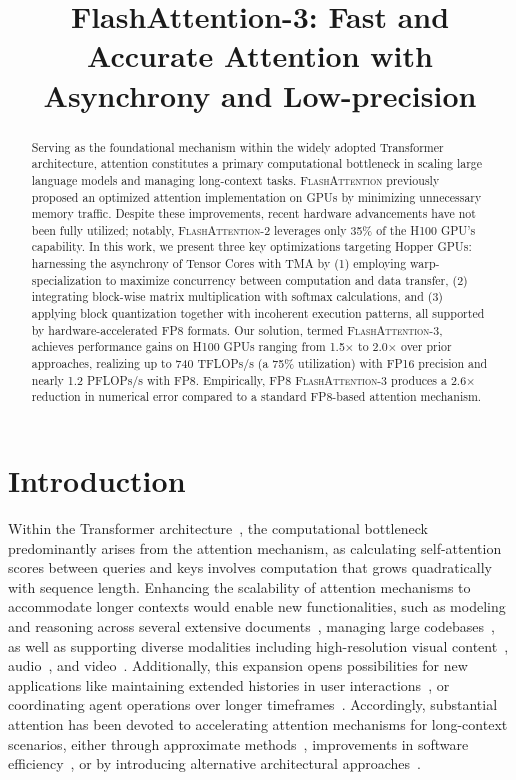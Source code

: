 \title{FlashAttention-3: Fast and Accurate Attention with Asynchrony and Low-precision}

\begin{abstract}
Serving as the foundational mechanism within the widely adopted Transformer architecture, attention constitutes a primary computational bottleneck in scaling large language models and managing long-context tasks. \textsc{FlashAttention} previously proposed an optimized attention implementation on GPUs by minimizing unnecessary memory traffic. Despite these improvements, recent hardware advancements have not been fully utilized; notably, \textsc{FlashAttention-2} leverages only 35\% of the H100 GPU’s capability. In this work, we present three key optimizations targeting Hopper GPUs: harnessing the asynchrony of Tensor Cores with TMA by (1) employing warp-specialization to maximize concurrency between computation and data transfer, (2) integrating block-wise matrix multiplication with softmax calculations, and (3) applying block quantization together with incoherent execution patterns, all supported by hardware-accelerated FP8 formats. Our solution, termed \textsc{FlashAttention-3}, achieves performance gains on H100 GPUs ranging from 1.5$\times$ to 2.0$\times$ over prior approaches, realizing up to 740 TFLOPs/s (a 75\% utilization) with FP16 precision and nearly 1.2 PFLOPs/s with FP8. Empirically, FP8 \textsc{FlashAttention-3} produces a 2.6$\times$ reduction in numerical error compared to a standard FP8-based attention mechanism.
\end{abstract}

\section{Introduction}
\label{sec:intro}

Within the Transformer architecture~\citep{vaswani2017attention}, the computational bottleneck predominantly arises from the attention mechanism, as calculating self-attention scores between queries and keys involves computation that grows quadratically with sequence length. Enhancing the scalability of attention mechanisms to accommodate longer contexts would enable new functionalities, such as modeling and reasoning across several extensive documents~\citep{guo2021longt5,shaham2022scrolls,peng2023yarn}, managing large codebases~\citep{roziere2023code, li2023starcoder}, as well as supporting diverse modalities including high-resolution visual content~\citep{chen2022scaling}, audio~\citep{gulati2020conformer}, and video~\citep{ho2022video}. Additionally, this expansion opens possibilities for new applications like maintaining extended histories in user interactions~\citep{sun2019bert4rec}, or coordinating agent operations over longer timeframes~\citep{yao2022react}. Accordingly, substantial attention has been devoted to accelerating attention mechanisms for long-context scenarios, either through approximate methods~\citep{katharopoulos2020transformers,choromanski2020rethinking,
tay2020efficient}, improvements in software efficiency~\citep{rabe2021self,dao2022flashattention,kwon2023efficient}, or by introducing alternative architectural approaches~\citep{peng2023rwkv,sun2023retentive,gu2023mamba}.

